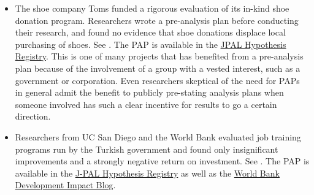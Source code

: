 \documentclass[12pt] {article}
\begin{document}
\begin{itemize}
\item
The shoe company Toms funded a rigorous evaluation of its in-kind shoe donation program. Researchers wrote a pre-analysis plan before conducting their research, and found no evidence that shoe donations displace local purchasing of shoes. See \cite{wydick_-kind_2014, katz_elizabeth_pre-analysis_2013}. The PAP is available in the \href{http://www.povertyactionlab.org/doc/pre-analysis-planwydick2-12-13pdf}{JPAL Hypothesis Registry}. This is one of many projects that has benefited from a pre-analysis plan because of the involvement of a group with a vested interest, such as a government or corporation. Even researchers skeptical of the need for PAPs in general admit the benefit to publicly pre-stating analysis plans when someone involved has such a clear incentive for results to go a certain direction. 

\item
Researchers from UC San Diego and the World Bank evaluated job training programs run by the Turkish government and found only insignificant improvements and a strongly negative return on investment. See \cite{almeida_impact_2012, vocationalTurkey}. The PAP is available in the \href{http://www.povertyactionlab.org/Hypothesis-Registry}{J-PAL Hypothesis Registry} as well as the \href{http://blogs.worldbank.org/impactevaluations/files/impactevaluations/iskurie_analysisplan_v4a.pdf}{World Bank Development Impact Blog}.





\end{itemize}
\end{document}
